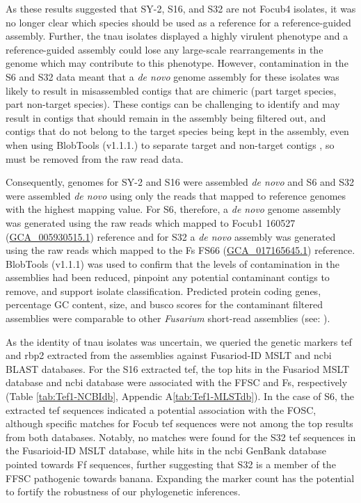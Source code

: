 As these results suggested that SY-2, S16, and S32 are not \ac{Focub4} isolates, it was no longer clear which species should be used as a reference for a reference-guided assembly. Further, the \ac{tnau} isolates displayed a highly virulent phenotype and a reference-guided assembly could lose any large-scale rearrangements in the genome which may contribute to this phenotype. However, contamination in the S6 and S32 data meant that a \textit{de novo} genome assembly for these isolates was likely to result in misassembled contigs that are chimeric (part target species, part non-target species). These contigs can be challenging to identify and may result in contigs that should remain in the assembly being filtered out, and contigs that do not belong to the target species being kept in the assembly, even when using BlobTools (v1.1.1.) to separate target and non-target contigs \parencite{Cornet2022}, so must be removed from the raw read data. 

Consequently, genomes for SY-2 and S16 were assembled \textit{de novo} and S6 and S32 were assembled \textit{de novo} using only the reads that mapped to reference genomes with the highest mapping value. For S6, therefore, a \textit{de novo} genome assembly was generated using the raw reads which mapped to \ac{Focub1} 160527 (\href{https://www.ncbi.nlm.nih.gov/datasets/genome/GCA_005930515.1/}{GCA\_005930515.1}) reference and for S32 a \textit{de novo} assembly was generated using the raw reads which mapped to the \ac{Fs} FS66 (\href{https://www.ncbi.nlm.nih.gov/datasets/genome/GCA_017165645.1/}{GCA\_017165645.1}) reference. BlobTools (v1.1.1) was used to confirm that the levels of contamination in the assemblies had been reduced, pinpoint any potential contaminant contigs to remove, and support isolate classification. Predicted protein coding genes, percentage GC content, size, and \ac{busco} scores for the contaminant filtered assemblies were comparable to other \textit{Fusarium} short-read assemblies (see: \textcite{DitaHerai2013, Chiara2015, Srivastava2018}).

As the identity of \ac{tnau} isolates was uncertain, we queried the genetic markers \acf{tef} and \acf{rbp2} extracted from the assemblies against Fusariod-ID MSLT and \ac{ncbi} BLAST databases. For the S16 extracted \ac{tef}, the top hits in the Fusariod MSLT database and \ac{ncbi} database were associated with the \ac{FFSC} and \ac{Fs}, respectively (Table \ref{tab:Tef1-NCBIdb}, Appendic A\ref{tab:Tef1-MLSTdb}). In the case of S6, the extracted \ac{tef} sequences indicated a potential association with the \ac{FOSC}, although specific matches for \ac{Focub} \ac{tef} sequences were not among the top results from both databases. Notably, no matches were found for the S32 \ac{tef} sequences in the Fusarioid-ID MSLT database, while hits in the \ac{ncbi} GenBank database pointed towards \ac{Ff} sequences, further suggesting that S32 is a member of the \ac{FFSC} pathogenic towards banana. Expanding the marker count has the potential to fortify the robustness of our phylogenetic inferences. 

